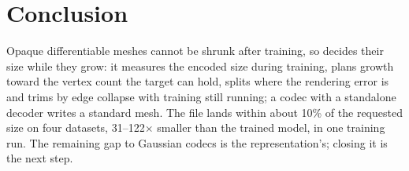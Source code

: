 \section{Conclusion}
Opaque differentiable meshes cannot be shrunk after training, so \BM decides their size while they grow: it measures the encoded size during training, plans growth toward the vertex count the target can hold, splits where the rendering error is and trims by edge collapse with training still running; a codec with a standalone decoder writes a standard mesh. The file lands within about 10\% of the requested size on four datasets, 31--122$\times$ smaller than the trained model, in one training run. The remaining gap to Gaussian codecs is the representation's; closing it is the next step.
